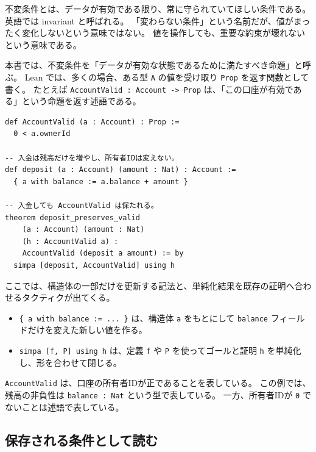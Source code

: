 不変条件とは、データが有効である限り、常に守られていてほしい条件である。
英語では invariant と呼ばれる。
「変わらない条件」という名前だが、値がまったく変化しないという意味ではない。
値を操作しても、重要な約束が壊れないという意味である。

\begin{definitionbox}
本書では、不変条件を「データが有効な状態であるために満たすべき命題」と呼ぶ。
Lean では、多くの場合、ある型 \texttt{A} の値を受け取り \texttt{Prop} を返す関数として書く。
たとえば \texttt{AccountValid : Account -> Prop} は、「この口座が有効である」という命題を返す述語である。
\end{definitionbox}

\begin{listing}[htbp]
\begin{verbatim}
def AccountValid (a : Account) : Prop :=
  0 < a.ownerId

-- 入金は残高だけを増やし、所有者IDは変えない。
def deposit (a : Account) (amount : Nat) : Account :=
  { a with balance := a.balance + amount }

-- 入金しても AccountValid は保たれる。
theorem deposit_preserves_valid
    (a : Account) (amount : Nat)
    (h : AccountValid a) :
    AccountValid (deposit a amount) := by
  simpa [deposit, AccountValid] using h
\end{verbatim}
\caption{口座が有効であることを述語として表す}
\label{lst:ch04_invariant_predicate}
\end{listing}

\begin{syntaxbox}
ここでは、構造体の一部だけを更新する記法と、単純化結果を既存の証明へ合わせるタクティクが出てくる。
\begin{itemize}
\item \texttt{\{ a with balance := ... \}} は、構造体 \texttt{a} をもとにして \texttt{balance} フィールドだけを変えた新しい値を作る。
\item \texttt{simpa [f, P] using h} は、定義 \texttt{f} や \texttt{P} を使ってゴールと証明 \texttt{h} を単純化し、形を合わせて閉じる。
\end{itemize}
\end{syntaxbox}

\texttt{AccountValid} は、口座の所有者IDが正であることを表している。
この例では、残高の非負性は \texttt{balance : Nat} という型で表している。
一方、所有者IDが \texttt{0} でないことは述語で表している。

\subsection{保存される条件として読む}

